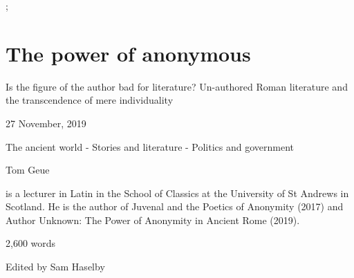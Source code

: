 \documentclass[../main.tex]{subfiles}
\begin{document}
;
\chapter{The power of anonymous}
\begin{subtitle}
Is the figure of the author bad for literature? Un-authored Roman literature and the transcendence of mere individuality
\end{subtitle}

\begin{metadata}
27 November, 2019

The ancient world - Stories and literature - Politics and government



Tom Geue

is a lecturer in Latin in the School of Classics at the University of St Andrews in Scotland. He is the author of Juvenal and the Poetics of Anonymity (2017) and Author Unknown: The Power of Anonymity in Ancient Rome (2019).

2,600 words

Edited by
Sam Haselby

\end{metadata}
\end{document}
